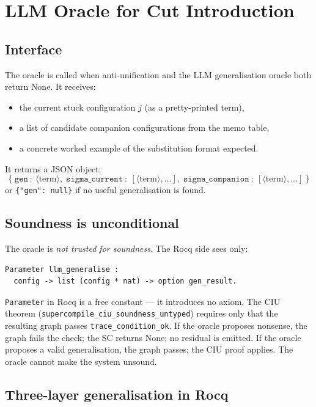 \section{LLM Oracle for Cut Introduction}
\label{sec:llm}

\subsection{Interface}

The oracle is called when anti-unification and the LLM generalisation
oracle both return
\textsf{None}.  It receives:
\begin{itemize}[leftmargin=*]
\item the current stuck configuration $j$ (as a pretty-printed term),
\item a list of candidate companion configurations from the memo table,
\item a concrete worked example of the substitution format expected.
\end{itemize}
It returns a JSON object:
\[
  \{\ \mathtt{gen}\ :\ \langle\text{term}\rangle,\;
      \mathtt{sigma\_current}\ :\ [\langle\text{term}\rangle,\ldots],\;
      \mathtt{sigma\_companion}\ :\ [\langle\text{term}\rangle,\ldots]\ \}
\]
or \texttt{\{"gen": null\}} if no useful generalisation is found.

\subsection{Soundness is unconditional}

The oracle is \emph{not trusted for soundness}.  The Rocq side sees only:

\begin{lstlisting}[language={}]
Parameter llm_generalise :
  config -> list (config * nat) -> option gen_result.
\end{lstlisting}

\noindent
\texttt{Parameter} in Rocq is a free constant --- it introduces no axiom.
The CIU theorem (\texttt{supercompile\_ciu\_soundness\_untyped}) requires only
that the resulting graph passes \texttt{trace\_condition\_ok}.  If the oracle
proposes nonsense, the graph fails the check; the SC returns \textsf{None}; no
residual is emitted.  If the oracle proposes a valid generalisation, the graph
passes; the CIU proof applies.  The oracle cannot make the system unsound.

\subsection{Three-layer generalisation in Rocq}

